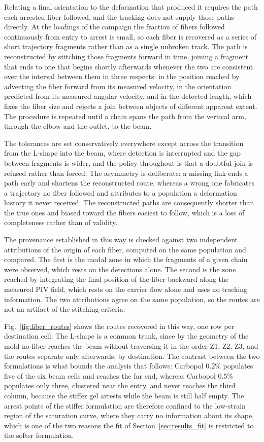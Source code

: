 \documentclass[%
  aip,
  pof,          %
  reprint,      %
  floatfix
]{revtex4-2}
\begin{document}
Relating a final orientation to the deformation that produced it requires the path each arrested fiber followed, and the tracking does not supply those paths directly. At the loadings of the campaign the fraction of fibers followed continuously from entry to arrest is small, so each fiber is recovered as a series of short trajectory fragments rather than as a single unbroken track. The path is reconstructed by stitching those fragments forward in time, joining a fragment that ends to one that begins shortly afterwards whenever the two are consistent over the interval between them in three respects: in the position reached by advecting the fiber forward from its measured velocity, in the orientation predicted from its measured angular velocity, and in the detected length, which fixes the fiber size and rejects a join between objects of different apparent extent. The procedure is repeated until a chain spans the path from the vertical arm, through the elbow and the outlet, to the beam.

The tolerances are set conservatively everywhere except across the transition from the L-shape into the beam, where detection is interrupted and the gap between fragments is wider, and the policy throughout is that a doubtful join is refused rather than forced. The asymmetry is deliberate: a missing link ends a path early and shortens the reconstructed route, whereas a wrong one fabricates a trajectory no fiber followed and attributes to a population a deformation history it never received. The reconstructed paths are consequently shorter than the true ones and biased toward the fibers easiest to follow, which is a loss of completeness rather than of validity.

The provenance established in this way is checked against two independent attributions of the origin of each fiber, computed on the same population and compared. The first is the modal zone in which the fragments of a given chain were observed, which rests on the detections alone. The second is the zone reached by integrating the final position of the fiber backward along the measured PIV field, which rests on the carrier flow alone and uses no tracking information. The two attributions agree on the same population, so the routes are not an artifact of the stitching criteria.

Fig.~\ref{fig:fiber_routes} shows the routes recovered in this way, one row per destination cell. The L-shape is a common trunk, since by the geometry of the mold no fiber reaches the beam without traversing it in the order Z1, Z2, Z3, and the routes separate only afterwards, by destination. The contrast between the two formulations is what bounds the analysis that follows: Carbopol 0.2\% populates five of the six beam cells and reaches the far end, whereas Carbopol 0.5\% populates only three, clustered near the entry, and never reaches the third column, because the stiffer gel arrests while the beam is still half empty. The arrest points of the stiffer formulation are therefore confined to the low-strain region of the saturation curve, where they carry no information about its shape, which is one of the two reasons the fit of Section~\ref{sec:results_fit} is restricted to the softer formulation.
\end{document}
